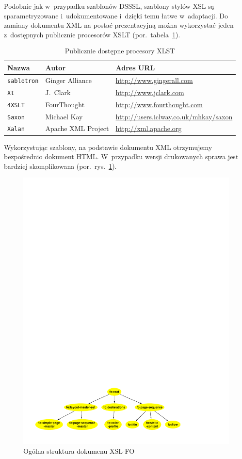 \documentclass[skorowidz,palatino,brudnopis,xodstep]{wimgr}
\begin{document}
Podobnie jak w~przypadku szablonów DSSSL, szablony stylów XSL są
sparametryzowane i~udokumentowane i~dzięki temu łatwe w~adaptacji. Do
zamiany dokumentu XML na postać prezentacyjną można wykorzystać jeden
z~dostępnych publicznie procesorów XSLT
(por.~tabela~\ref{zest:proces:xslt}).

\begin{table}[!htb]
\begin{tabular}{|l|l|l|} \hline
Nazwa & Autor      & Adres URL \\ \hline
\texttt{sablotron} & Ginger Alliance & \url{http://www.gingerall.com} \\ \hline
\texttt{Xt}        & J.~Clark & \url{http://www.jclark.com} \\ \hline
\texttt{4XSLT}     & FourThought & \url{http://www.fourthought.com} \\ \hline
\texttt{Saxon}     & Michael Kay &  \url{http://users.iclway.co.uk/mhkay/saxon} \\ \hline
\texttt{Xalan}     & Apache XML Project & \url{http://xml.apache.org} \\ \hline
\end{tabular}
\caption{Publicznie dostępne procesory XLST\label{zest:proces:xslt}}
\end{table}

Wykorzystując szablony, na podstawie dokumentu XML otrzymujemy
bezpośrednio dokument HTML. W~przypadku wersji drukowanych sprawa jest
bardziej skomplikowana (por.~rys.~\ref{fig:xsl-fo}).

\begin{figure}[!tbh]
\centering 
\includegraphics[width=.8\hsize]{fo-structure}
\caption{Ogólna struktura dokumenu XSL-FO\label{fig:xsl-fo}}
\end{figure}
\end{document}
